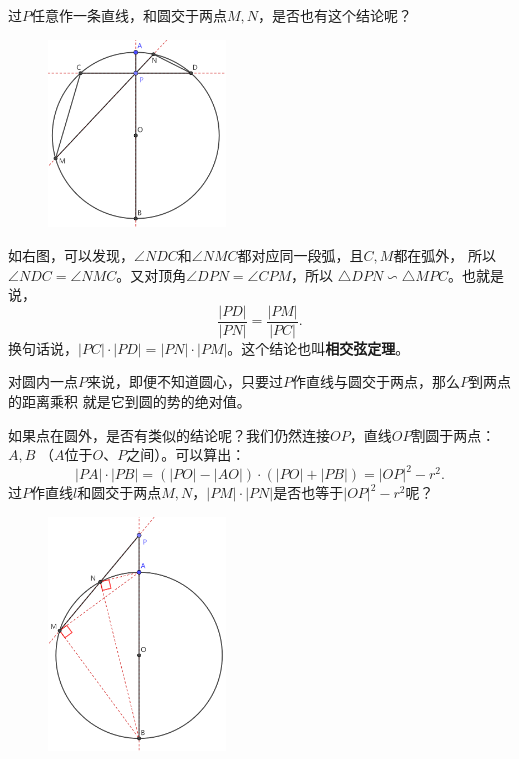 \documentclass[12pt,UTF8]{ctexbook}
\begin{document}
过$P$任意作一条直线，和圆交于两点$M,N$，是否也有这个结论呢？

\begin{figure} %
    \vspace{-22pt}
    \flushright
    \includegraphics[width=0.42\textwidth]{圆势1.png}
\end{figure}

如右图，可以发现，$\angle NDC$和$\angle NMC$都对应同一段弧，且$C,M$都在弧外，
所以$\angle NDC = \angle NMC$。又对顶角$\angle DPN = \angle CPM$，所以
$ \triangle DPN \backsim \triangle MPC$。也就是说，
$$ \frac{|PD|}{|PN|} = \frac{|PM|}{|PC|}.$$
换句话说，$|PC| \cdot |PD| = |PN|\cdot|PM|$。这个结论也叫\textbf{相交弦定理}。

对圆内一点$P$来说，即便不知道圆心，只要过$P$作直线与圆交于两点，那么$P$到两点的距离乘积
就是它到圆的势的绝对值。

如果点在圆外，是否有类似的结论呢？我们仍然连接$OP$，直线$OP$割圆于两点：$A,B$
（$A$位于$O$、$P$之间）。可以算出：
$$|PA|\cdot|PB| = (|PO| - |AO|) \cdot (|PO| + |PB|) = |OP|^2 - r^2.$$
过$P$作直线$l$和圆交于两点$M,N$，$|PM| \cdot |PN|$是否也等于$|OP|^2 - r^2$呢？

\begin{figure} %
    \vspace{-18pt}
    \flushright
    \includegraphics[width=0.42\textwidth]{圆势2.png}
\end{figure}
\end{document}
